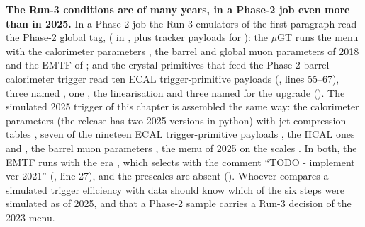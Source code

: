 \textbf{The Run-3 conditions are of many years, in a Phase-2 job even more than in 2025.} In a Phase-2 job the Run-3
emulators of the first paragraph read the Phase-2 global tag, 
( in , plus tracker payloads for ): the
$\mu$GT runs the menu  with the calorimeter parameters , the
barrel and global muon parameters of 2018 and the EMTF of ; and the crystal primitives that feed the
Phase-2 barrel calorimeter trigger read ten ECAL trigger-primitive payloads (, lines
55--67), three named , one , the linearisation  and three named
for the upgrade (). The simulated 2025 trigger of this chapter is assembled the same
way: the calorimeter parameters  (the release has two 2025 versions in python) with jet compression
tables , seven of the nineteen ECAL trigger-primitive payloads , the HCAL ones 
and , the barrel muon parameters , the menu of 2025 on the scales
. In both, the EMTF runs with the era , which selects
 with the comment ``TODO - implement ver 2021''
(, line 27), and the prescales are absent (). Whoever
compares a simulated trigger efficiency with data should know which of the six steps were simulated as of 2025, and
that a Phase-2 sample carries a Run-3 decision of the 2023 menu.
